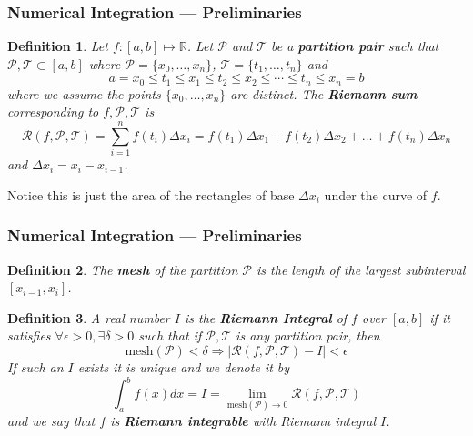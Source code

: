 \documentclass[11pt,xcolor={svgnames},aspectratio=169,usepdftitle=false]{beamer}
\newtheorem{definition}{Definition}
\begin{document}
\begin{frame}
  \frametitle{Numerical Integration --- Preliminaries}
\begin{definition}
  Let $f : [a,b]\mapsto\mathbb{R}$. Let $\mathcal{P}$ and $\mathcal{T}$ be a \alert{\textbf{partition pair}} such that $\mathcal{P},\mathcal{T}\subset [a,b]$ where $\mathcal{P} = \{x_0,\ldots,x_n\}$, $\mathcal{T} = \{t_1,\ldots,t_n\}$ and 
  \[
  a = x_0 \leq t_1 \leq x_1 \leq t_2 \leq x_2 \leq \cdots \leq t_n \leq x_n = b  
  \]
  where we assume the points $\{x_0,\ldots,x_n\}$ are distinct. The \alert{\textbf{Riemann sum}} corresponding to $f,\mathcal{P},\mathcal{T}$ is
  \[
  \mathcal{R}(f,\mathcal{P},\mathcal{T}) = \sum^n_{i=1}f(t_i)\Delta x_i = f(t_1)\Delta x_1 + f(t_2)\Delta x_2 + \ldots + f(t_n)\Delta x_n
  \]
  and $\Delta x_i = x_i - x_{i-1}$.
\end{definition}

{\footnotesize Notice this is just the area of the rectangles of base $\Delta x_i$ under the curve of $f$.}
\end{frame}

\begin{frame}
  \frametitle{Numerical Integration --- Preliminaries}
\begin{definition}
The \alert{\textbf{mesh}} of the partition $\mathcal{P}$ is the length of the largest subinterval $[x_{i-1},x_i]$.
\end{definition}
\begin{definition}
A real number $I$ is the \alert{\textbf{Riemann Integral}} of $f$ over $[a,b]$ if it satisfies $\forall \epsilon > 0, \exists \delta > 0$ such that if $\mathcal{P},\mathcal{T}$ is any partition pair, then
\[
\text{mesh}(\mathcal{P}) < \delta \Rightarrow \lvert \mathcal{R}(f,\mathcal{P},\mathcal{T}) - I \rvert < \epsilon
\]
If such an $I$ exists it is unique and we denote it by
\[
\int^b_a f(x)  dx = I = \lim_{\text{mesh}(\mathcal{P})\rightarrow 0} \mathcal{R}(f,\mathcal{P},\mathcal{T})
\]
and we say that $f$ is \alert{\textbf{Riemann integrable}} with Riemann integral $I$.
\end{definition}
\end{frame}
\end{document}
